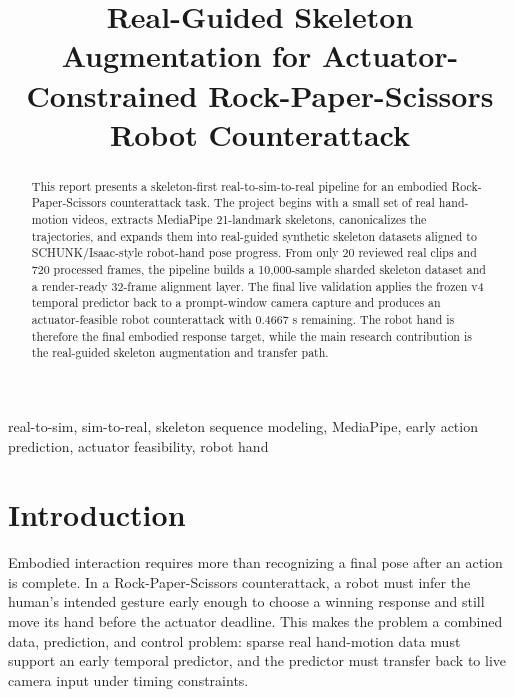 \documentclass[conference]{IEEEtran}
\begin{document}
\title{Real-Guided Skeleton Augmentation for Actuator-Constrained Rock-Paper-Scissors Robot Counterattack}

\author{
}

\maketitle

\begin{abstract}
This report presents a skeleton-first real-to-sim-to-real pipeline for an embodied Rock-Paper-Scissors counterattack task. The project begins with a small set of real hand-motion videos, extracts MediaPipe 21-landmark skeletons, canonicalizes the trajectories, and expands them into real-guided synthetic skeleton datasets aligned to SCHUNK/Isaac-style robot-hand pose progress. From only 20 reviewed real clips and 720 processed frames, the pipeline builds a 10,000-sample sharded skeleton dataset and a render-ready 32-frame alignment layer. The final live validation applies the frozen v4 temporal predictor back to a prompt-window camera capture and produces an actuator-feasible robot counterattack with 0.4667 s remaining. The robot hand is therefore the final embodied response target, while the main research contribution is the real-guided skeleton augmentation and transfer path.
\end{abstract}

\begin{IEEEkeywords}
real-to-sim, sim-to-real, skeleton sequence modeling, MediaPipe, early action prediction, actuator feasibility, robot hand
\end{IEEEkeywords}

\section{Introduction}

Embodied interaction requires more than recognizing a final pose after an action is complete. In a Rock-Paper-Scissors counterattack, a robot must infer the human's intended gesture early enough to choose a winning response and still move its hand before the actuator deadline. This makes the problem a combined data, prediction, and control problem: sparse real hand-motion data must support an early temporal predictor, and the predictor must transfer back to live camera input under timing constraints.
\end{document}
